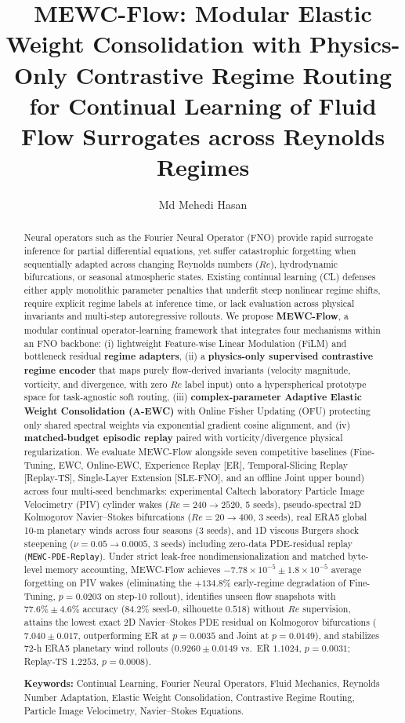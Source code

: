 \documentclass[11pt,a4paper]{article}
\title{\textbf{MEWC-Flow: Modular Elastic Weight Consolidation with Physics-Only Contrastive Regime Routing for Continual Learning of Fluid Flow Surrogates across Reynolds Regimes}}
\author{Md Mehedi Hasan}
\date{}
\begin{document}
\maketitle

\begin{abstract}
Neural operators such as the Fourier Neural Operator (FNO) provide rapid surrogate inference for partial differential equations, yet suffer catastrophic forgetting when sequentially adapted across changing Reynolds numbers ($Re$), hydrodynamic bifurcations, or seasonal atmospheric states. Existing continual learning (CL) defenses either apply monolithic parameter penalties that underfit steep nonlinear regime shifts, require explicit regime labels at inference time, or lack evaluation across physical invariants and multi-step autoregressive rollouts. We propose \textbf{MEWC-Flow}, a modular continual operator-learning framework that integrates four mechanisms within an FNO backbone: (i) lightweight Feature-wise Linear Modulation (FiLM) and bottleneck residual \textbf{regime adapters}, (ii) a \textbf{physics-only supervised contrastive regime encoder} that maps purely flow-derived invariants (velocity magnitude, vorticity, and divergence, with zero $Re$ label input) onto a hyperspherical prototype space for task-agnostic soft routing, (iii) \textbf{complex-parameter Adaptive Elastic Weight Consolidation (A-EWC)} with Online Fisher Updating (OFU) protecting only shared spectral weights via exponential gradient cosine alignment, and (iv) \textbf{matched-budget episodic replay} paired with vorticity/divergence physical regularization. We evaluate MEWC-Flow alongside seven competitive baselines (Fine-Tuning, EWC, Online-EWC, Experience Replay [ER], Temporal-Slicing Replay [Replay-TS], Single-Layer Extension [SLE-FNO], and an offline Joint upper bound) across four multi-seed benchmarks: experimental Caltech laboratory Particle Image Velocimetry (PIV) cylinder wakes ($Re = 240 \to 2520$, 5 seeds), pseudo-spectral 2D Kolmogorov Navier--Stokes bifurcations ($Re = 20 \to 400$, 3 seeds), real ERA5 global 10-m planetary winds across four seasons (3 seeds), and 1D viscous Burgers shock steepening ($\nu = 0.05 \to 0.0005$, 3 seeds) including zero-data PDE-residual replay (\texttt{MEWC-PDE-Replay}). Under strict leak-free nondimensionalization and matched byte-level memory accounting, MEWC-Flow achieves $-7.78 \times 10^{-5} \pm 1.8 \times 10^{-5}$ average forgetting on PIV wakes (eliminating the $+134.8\%$ early-regime degradation of Fine-Tuning, $p = 0.0203$ on step-10 rollout), identifies unseen flow snapshots with $77.6\% \pm 4.6\%$ accuracy ($84.2\%$ seed-0, silhouette $0.518$) without $Re$ supervision, attains the lowest exact 2D Navier--Stokes PDE residual on Kolmogorov bifurcations ($7.040 \pm 0.017$, outperforming ER at $p = 0.0035$ and Joint at $p = 0.0149$), and stabilizes 72-h ERA5 planetary wind rollouts ($0.9260 \pm 0.0149$ vs.\ ER $1.1024$, $p = 0.0031$; Replay-TS $1.2253$, $p = 0.0008$).

\medskip
\noindent\textbf{Keywords:} Continual Learning, Fourier Neural Operators, Fluid Mechanics, Reynolds Number Adaptation, Elastic Weight Consolidation, Contrastive Regime Routing, Particle Image Velocimetry, Navier--Stokes Equations.
\end{abstract}
\end{document}
